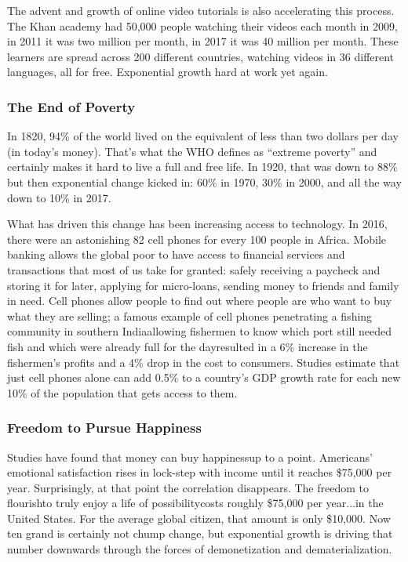 {  The advent and growth of online video tutorials is also accelerating this
  process. The Khan academy had 50,000 people watching their videos each month
  in 2009, in 2011 it was two million per month, in 2017 it was 40 million per
  month. These learners are spread across 200 different countries, watching
  videos in 36 different languages, all for free. Exponential growth hard at
  work yet again.

  \subsubsection*{The End of Poverty}
  \newReading In 1820, 94\% of the world lived on the equivalent of less than
  two dollars per day (in today's money). That's what the WHO defines as
  ``extreme poverty'' and certainly makes it hard to live a full and free life.
  In 1920, that was down to 88\% but then exponential change kicked in: 60\% in
  1970, 30\% in 2000, and all the way down to 10\% in 2017.

  What has driven this change has been increasing access to technology. In 2016,
  there were an astonishing 82 cell phones for every 100 people in Africa.
  Mobile banking allows the global poor to have access to financial services and
  transactions that most of us take for granted: safely receiving a paycheck and
  storing it for later, applying for micro-loans, sending money to friends and
  family in need. Cell phones allow people to find out where people are who want
  to buy what they are selling; a famous example of cell phones penetrating a
  fishing community in southern India\textemdash{}allowing fishermen to know
  which port still needed fish and which were already full for the
  day\textemdash{}resulted in a 6\% increase in the fishermen's profits and a
  4\% drop in the cost to consumers. Studies estimate that just cell phones
  alone can add 0.5\% to a country's GDP growth rate for each new 10\% of the
  population that gets access to them.

  \subsubsection*{Freedom to Pursue Happiness}
  \newReading Studies have found that money can buy happiness\textemdash{}up to
  a point. Americans' emotional satisfaction rises in lock-step with income
  until it reaches \$75,000 per year. Surprisingly, at that point the
  correlation disappears. The freedom to flourish\textemdash{}to truly enjoy a
  life of possibility\textemdash{}costs roughly \$75,000 per year...in the
  United States.  For the average global citizen, that amount is only \$10,000.
  Now ten grand is certainly not chump change, but exponential growth is driving
  that number downwards through the forces of demonetization and
  dematerialization.

}
